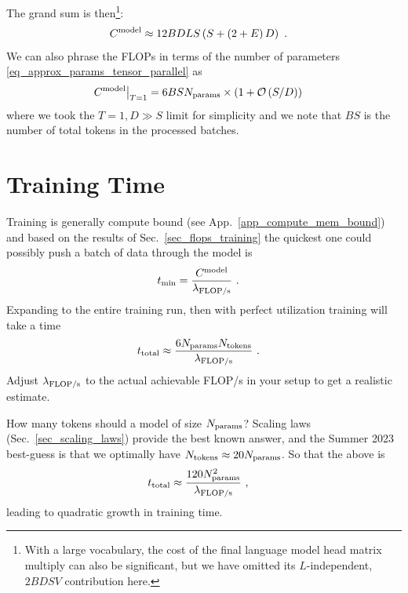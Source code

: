 \documentclass[11pt]{article}
\begin{document}
The grand sum is then\footnote{With a large vocabulary, the cost of the final language model head
	matrix multiply can also be significant, but we have omitted its $ L $-independent,  $ 2BDSV $
	contribution here. }:
\begin{align}
	C  ^{ {\rm  model}  } & \approx 12 BDLS \left ( S + \left ( 2+E \right )D \right ) \label{eq_model_flops}\ .
\end{align}
We can also phrase the FLOPs in terms of the number of parameters \eqref{eq_approx_params_tensor_parallel} as
\begin{align}
	C  ^{ {\rm  model}  } \big| _{ T=1 } & = 6BS N _{ {\rm  params}  }\times \left ( 1 + \mathcal{O} \left( S/D\right)  \right )
\end{align}
where we took the $ T=1, D \gg S $ limit for simplicity and we note that $ BS $  is the number of
total tokens in the processed batches.


\section{Training Time \label{sec_train_time} }



Training is generally compute bound (see App.~\ref{app_compute_mem_bound}) and based on the results
of Sec.~\ref{sec_flops_training} the quickest one could possibly push a batch of data through the
model is
\begin{align}
	t _{ {\rm  min} } & = \frac{ C  ^{ {\rm  model}  }  }{   \lambda _{ {\rm FLOP/s} } }\ . \label{eq_tmin_model}
\end{align}
Expanding to the entire training run, then with perfect utilization training will take a time
\begin{align}
	t _{ {\rm  total} } & \approx  \frac{6N _{ {\rm params} } N _{ {\rm tokens} }}{   \lambda _{ {\rm FLOP/s} } }\ . \label{eq_training_rule_of_thumb}
\end{align}
Adjust $ \lambda _{ {\rm FLOP/s} } $ to the actual achievable FLOP/s in your setup to get a realistic estimate.

How many tokens should a model of size $ N _{ {\rm params} } $? Scaling laws (Sec.~\ref{sec_scaling_laws}) provide
the best known answer, and the Summer 2023 best-guess is that we optimally have $ N _{ {\rm tokens} }\approx 20 N _{ {\rm params} } $.
So that the above is
\begin{align}
	t _{ {\rm  total} } & \approx  \frac{120N _{ {\rm params} } ^{ 2 }}{   \lambda _{ {\rm FLOP/s} } }\ ,
\end{align}
leading to quadratic growth in training time.
\end{document}
